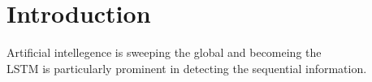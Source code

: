 \section{Introduction}
Artificial intellegence is sweeping the global and becomeing the 
\\
LSTM is particularly prominent in detecting the sequential information. 